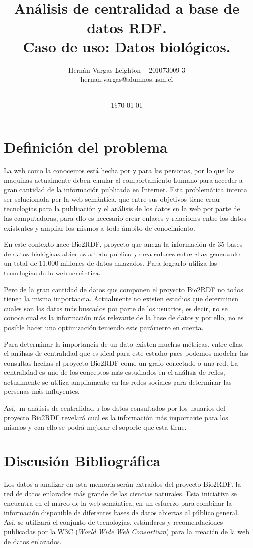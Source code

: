 \documentclass[spanish, fleqn, twocolumn]{IEEEtran/IEEEtran}
\title{~\\ Análisis de centralidad a base de datos RDF.\\
       Caso de uso: Datos biológicos.}
\author{Hernán Vargas Leighton -- 201073009-3 \\ hernan.vargas@alumnos.usm.cl\\~}
\date{\today}
\begin{document}
\maketitle
\thispagestyle{empty}
\thispagestyle{fancy}

\section{Definición del problema}
La web como la conocemos está hecha por y para las personas, por lo que las
maquinas actualmente deben emular el comportamiento humano para acceder a
gran cantidad de la información publicada en Internet. Esta problemática intenta
ser solucionada por la web semántica, que entre sus objetivos tiene crear
tecnologías para la publicación y el análisis de los datos en la web por parte
de las computadoras, para ello es necesario crear enlaces y relaciones entre los
datos existentes y ampliar los mismos a todo ámbito de conocimiento.

En este contexto nace Bio2RDF, proyecto que anexa la información de 35 bases de
datos biológicas abiertas a todo publico y crea enlaces entre ellas generando un
total de 11.000 millones de datos enlazados. Para lograrlo utiliza las
tecnologías de la web semántica.

Pero de la gran cantidad de datos que componen el proyecto Bio2RDF no todos
tienen la misma importancia. Actualmente no existen estudios que determinen
cuales son los datos más buscados por parte de los usuarios, es decir, no se
conoce cual es la información más relevante de la base de datos y por ello,
no es posible hacer una optimización teniendo este parámetro en cuenta.

Para determinar la importancia de un dato existen muchas métricas, entre ellas,
el análisis de centralidad que es ideal para este estudio pues podemos modelar
las consultas hechas al proyecto Bio2RDF como un grafo conectado o una red.
La centralidad es uno de los conceptos más estudiados en el análisis de redes,
actualmente se utiliza ampliamente en las redes sociales para determinar las
personas más influyentes.

Así, un análisis de centralidad a los datos consultados por los usuarios del
proyecto Bio2RDF revelará cual es la información más importante para los mismos
y con ello se podrá mejorar el soporte que esta tiene.

\section{Discusión Bibliográfica}
Los datos a analizar en esta memoria serán extraídos del proyecto 
Bio2RDF\cite{callahan2013bio2rdf}\cite{belleau2008bio2rdf}, la
red de datos enlazados más grande de las ciencias naturales. Esta iniciativa se
encuentra en el marco de la web semántica, en un esfuerzo para combinar la
información disponible de diferentes bases de datos abiertas al público general.
Así, se utilizará el conjunto de tecnologías, estándares y recomendaciones
publicadas por la W3C (\emph{World Wide Web Consortium}) para la creación de la
web de datos enlazados.
\end{document}
